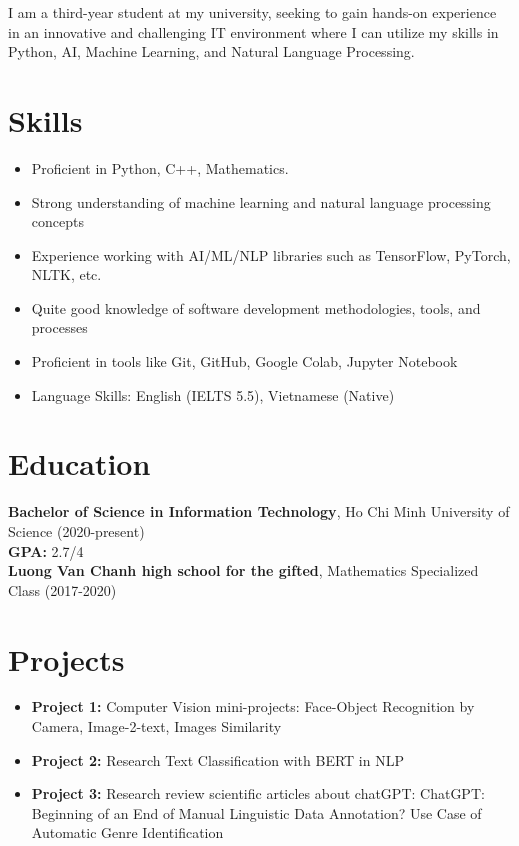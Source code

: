 \documentclass[a4paper,10pt]{article}
\begin{document}
I am a third-year student at my university, seeking to gain hands-on experience in an innovative and challenging IT environment where I can utilize my skills in Python, AI, Machine Learning, and Natural Language Processing.

\section*{Skills}

\begin{itemize}
    \item Proficient in Python, C++, Mathematics.
    \item Strong understanding of machine learning and natural language processing concepts
    \item Experience working with AI/ML/NLP libraries such as TensorFlow, PyTorch, NLTK, etc.
    \item Quite good knowledge of software development methodologies, tools, and processes
    \item Proficient in tools like Git, GitHub, Google Colab, Jupyter Notebook
    \item Language Skills: English (IELTS 5.5), Vietnamese (Native)
\end{itemize}

\section*{Education}

\textbf{Bachelor of Science in Information Technology}, Ho Chi Minh University of Science (2020-present)
\\
\textbf{GPA: } 2.7/4
\\
\textbf{Luong Van Chanh high school for the gifted}, Mathematics Specialized Class (2017-2020)

\section*{Projects}

\begin{itemize}
    \item \textbf{Project 1:} Computer Vision mini-projects: Face-Object Recognition by Camera, Image-2-text, Images Similarity
    \item \textbf{Project 2:} Research Text Classification with BERT in NLP
    \item \textbf{Project 3:} Research review scientific articles about chatGPT: ChatGPT: Beginning of an End of Manual Linguistic Data Annotation? Use Case of Automatic Genre Identification
\end{itemize}
\end{document}
